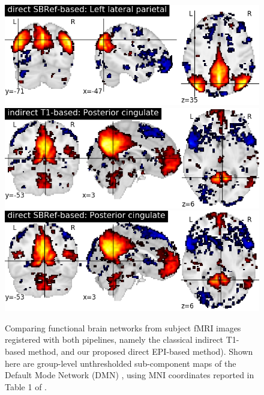 \begin{figure}
\includegraphics[width=.24\linewidth]{figures/DC+SBRef_Leftlateralparietal.png}
\includegraphics[width=.24\linewidth]{figures/DC+T1_Posteriorcingulate.png}
\includegraphics[width=.24\linewidth]{figures/DC+SBRef_Posteriorcingulate.png}
\caption{Comparing functional brain networks from subject fMRI images registered with both pipelines, namely the classical indirect T1-based method, and our proposed direct EPI-based method). Shown here are group-level unthresholded sub-component maps of the Default Mode Network (DMN) \cite{raichle2001}, using MNI coordinates reported in Table 1 of \cite{Watanabe2013}.}
  \label{fig:dmn}
\end{figure}

